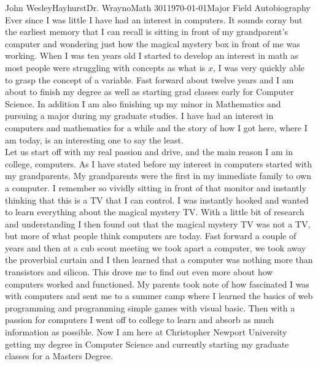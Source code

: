 \documentclass{article}
\begin{document}
\begin{mla}{John Wesley}{Hayhurst}{Dr. Wrayno}{Math 301}{\today}{Major Field Autobiography}
Ever since I was little I have had an interest in computers. It sounds corny but the earliest memory that I can recall is sitting in front of my grandparent's computer and wondering just how the magical mystery box in front of me was working. When I was ten years old I started to develop an interest in math as most people were struggling with concepts as what is $x$, I was very quickly able to grasp the concept of a variable. Fast forward about twelve years and I am about to finish my degree as well as starting grad classes early for Computer Science. In addition I am also finishing up my minor in Mathematics and pursuing a major during my graduate studies. I have had an interest in computers and mathematics for a while and the story of how I got here, where I am today, is an interesting one to say the least.\\

Let us start off with my real passion and drive, and the main reason I am in college, computers. As I have stated before my interest in computers started with my grandparents. My grandparents were the first in my immediate family to own a computer. I remember so vividly sitting in front of that monitor and instantly thinking that this is a TV that I can control. I was instantly hooked and wanted to learn everything about the magical mystery TV. With a little bit of research and understanding I then found out that the magical mystery TV was not a TV, but more of what people think computers are today. Fast forward a couple of years and then at a cub scout meeting we took apart a computer, we took away the proverbial curtain and I then learned that a computer was nothing more than transistors and silicon. This drove me to find out even more about how computers worked and functioned. My parents took note of how fascinated I was with computers and sent me to a summer camp where I learned the basics of web programming and programming simple games with visual basic. Then with a passion for computers I went off to college to learn and absorb as much information as possible. Now I am here at Christopher Newport University getting my degree in Computer Science and currently starting my graduate classes for a Masters Degree.\\


\end{mla}
\end{document}
